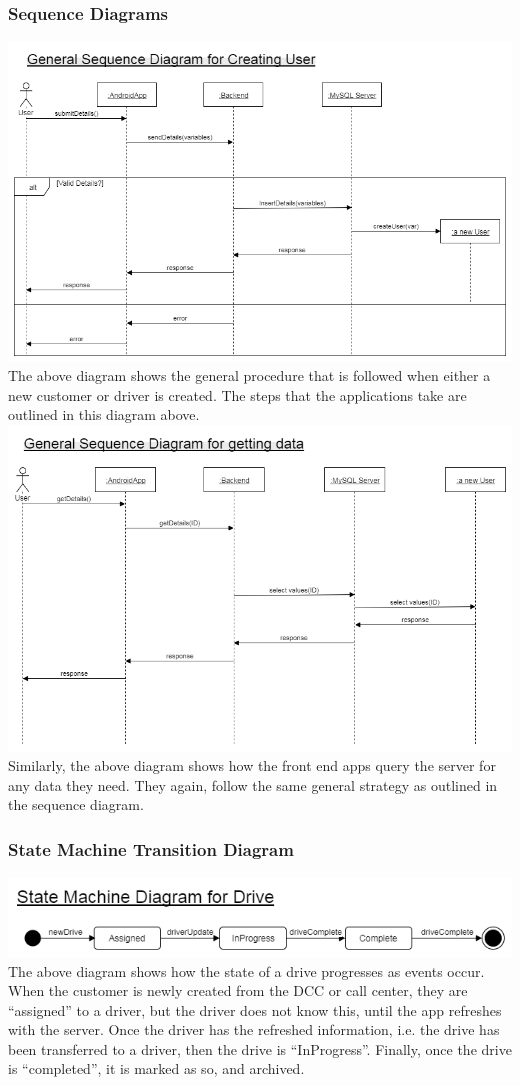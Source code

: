 \documentclass[a4paper,12pt]{article}
\begin{document}
\subsubsection{Sequence Diagrams}
\includegraphics[scale=0.5]{CreateSequenceDiagram}
The above diagram shows the general procedure that is followed when either a new customer or driver is created. The steps that the applications take are outlined in this diagram above.\\
\includegraphics[scale=0.5]{GetDataSequenceDiagram}
Similarly, the above diagram shows how the front end apps query the server for any data they need. They again, follow the same general strategy as outlined in the sequence diagram.

\subsubsection{State Machine Transition Diagram}
\includegraphics[scale=0.5]{statemachinediagram}
\\The above diagram shows how the state of a drive progresses as events occur. When the customer is newly created from the DCC or call center, they are ``assigned'' to a driver, but the driver does not know this, until the app refreshes with the server. Once the driver has the refreshed information, i.e. the drive has been transferred to a driver, then the drive is ``InProgress''. Finally, once the drive is ``completed'', it is marked as so, and archived.
\newpage
\end{document}
